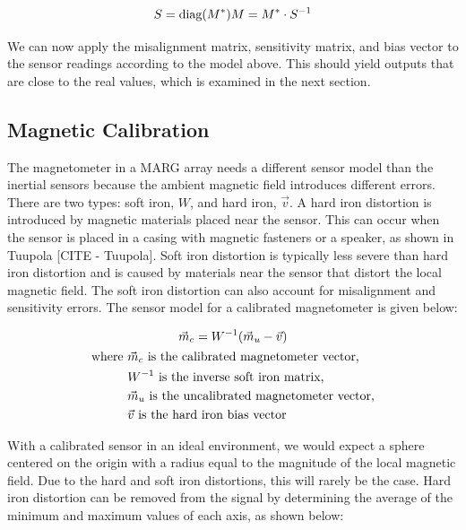 \begin{equation} \label{eq:sensativity_and_misalignment}
    S = \text{diag}(M^*) \\
    M = M^* \cdot S^{-1}
\end{equation}

We can now apply the misalignment matrix, sensitivity matrix, and bias vector to the sensor readings according to the model above. This should yield outputs that are close to the real values, which is examined in the next section.

\subsection{Magnetic Calibration}
The magnetometer in a MARG array needs a different sensor model than the inertial sensors because the ambient magnetic field introduces different errors. 
There are two types: soft iron, $W$, and hard iron, $\vec{v}$. 
A hard iron distortion is introduced by magnetic materials placed near the sensor. 
This can occur when the sensor is placed in a casing with magnetic fasteners or a speaker, as shown in Tuupola [CITE - Tuupola]. 
Soft iron distortion is typically less severe than hard iron distortion and is caused by materials near the sensor that distort the local magnetic field. 
The soft iron distortion can also account for misalignment and sensitivity errors. 
The sensor model for a calibrated magnetometer is given below:

\begin{gather} \label{eq:magnetic_model}
    \vec{m}_c=W^{-1}(\vec{m}_u-\vec{v}) \\
    \begin{aligned}
        \text{where } &\vec{m}_c \text{ is the calibrated magnetometer vector,} \\
        &W^{-1} \text{ is the inverse soft iron matrix,}\\
        &\vec{m}_u \text{ is the uncalibrated magnetometer vector,} \\
        &\vec{v} \text{ is the hard iron bias vector}
    \end{aligned} \notag
\end{gather}

With a calibrated sensor in an ideal environment, we would expect a sphere centered on the origin with a radius equal to the magnitude of the local magnetic field. 
Due to the hard and soft iron distortions, this will rarely be the case. 
Hard iron distortion can be removed from the signal by determining the average of the minimum and maximum values of each axis, as shown below:

